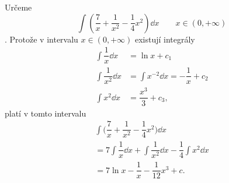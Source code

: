 \begin{mdframed}[style=mdexam]
  \begin{example}\label{MAI:exam144}
    Určeme \[\int\left(\dfrac{7}{x}+ \dfrac{1}{x^2} - \dfrac{1}{4}x^2\right)\dd{x}\qquad x\in(0,
    +\infty)\]. Protože v intervalu \(x\in(0, +\infty)\) existují integrály
    \begin{align*}
      \int\dfrac{1}{x}\dd{x}   &= \ln x + c_1  \\
      \int\dfrac{1}{x^2}\dd{x} &= \int x^{-2}\dd{x} = -\dfrac{1}{x} + c_2  \\
      \int x^2\dd{x}           &= \dfrac{x^3}{3} + c_3 ,
    \end{align*}  
    platí v tomto intervalu
    \begin{multline*}
      \int\bigl(\dfrac{7}{x}+ \dfrac{1}{x^2} - \dfrac{1}{4}x^2\bigr)\dd{x}                        \\
          =7\int\dfrac{1}{x}\dd{x} + \int\dfrac{1}{x^2}\dd{x} - \dfrac{1}{4}\int x^2\dd{x}        \\
          =7\ln x - \dfrac{1}{x} - \dfrac{1}{12}x^3 + c.
    \end{multline*}
  \end{example}
\end{mdframed}
